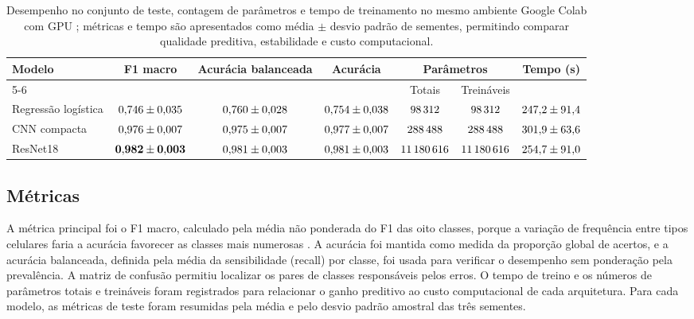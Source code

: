 \documentclass[conference]{IEEEtran}
\begin{document}
\begin{table}[t]
\caption{Desempenho no conjunto de teste, contagem de parâmetros e tempo de treinamento no mesmo ambiente Google Colab com GPU \ResultDevice{}; métricas e tempo são apresentados como média $\pm$ desvio padrão de \ResultRuns{} sementes, permitindo comparar qualidade preditiva, estabilidade e custo computacional.}
\label{tab:resultados}
\centering
\begin{tabular}{lcccccc}
\toprule
Modelo & F1 macro & Acurácia balanceada & Acurácia & \multicolumn{2}{c}{Parâmetros} & Tempo (s) \\
\cmidrule(lr){5-6}
& & & & Totais & Treináveis & \\
\midrule
Regressão logística & $0{,}746 \pm 0{,}035$ & $0{,}760 \pm 0{,}028$ & $0{,}754 \pm 0{,}038$ & $98\,312$ & $98\,312$ & $247{,}2 \pm 91{,}4$ \\
CNN compacta & $0{,}976 \pm 0{,}007$ & $0{,}975 \pm 0{,}007$ & $0{,}977 \pm 0{,}007$ & $288\,488$ & $288\,488$ & $301{,}9 \pm 63{,}6$ \\
ResNet18 & $\mathbf{0{,}982 \pm 0{,}003}$ & $0{,}981 \pm 0{,}003$ & $0{,}981 \pm 0{,}003$ & $11\,180\,616$ & $11\,180\,616$ & $254{,}7 \pm 91{,}0$ \\
\bottomrule
\end{tabular}
\end{table}

\subsection{Métricas}
A métrica principal foi o F1 macro, calculado pela média não ponderada do F1 das oito classes, porque a variação de frequência entre tipos celulares faria a acurácia favorecer as classes mais numerosas \cite{sokolova2009systematic}.
A acurácia foi mantida como medida da proporção global de acertos, e a acurácia balanceada, definida pela média da sensibilidade (recall) por classe, foi usada para verificar o desempenho sem ponderação pela prevalência.
A matriz de confusão permitiu localizar os pares de classes responsáveis pelos erros.
O tempo de treino e os números de parâmetros totais e treináveis foram registrados para relacionar o ganho preditivo ao custo computacional de cada arquitetura.
Para cada modelo, as métricas de teste foram resumidas pela média e pelo desvio padrão amostral das três sementes.
\end{document}
